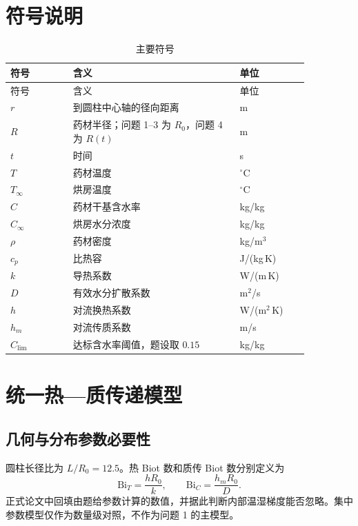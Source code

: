 \documentclass[UTF8,a4paper,11pt]{ctexart}
\begin{document}
\section{符号说明}

\begin{longtable}{p{0.18\linewidth}p{0.48\linewidth}p{0.20\linewidth}}
\caption{主要符号}\label{tab:symbols}\\
\toprule
符号 & 含义 & 单位\\
\midrule
\endfirsthead
\toprule
符号 & 含义 & 单位\\
\midrule
\endhead
$r$ & 到圆柱中心轴的径向距离 & m\\
$R$ & 药材半径；问题 1--3 为 $R_0$，问题 4 为 $R(t)$ & m\\
$t$ & 时间 & s\\
$T$ & 药材温度 & $^\circ$C\\
$T_\infty$ & 烘房温度 & $^\circ$C\\
$C$ & 药材干基含水率 & kg/kg\\
$C_\infty$ & 烘房水分浓度 & kg/kg\\
$\rho$ & 药材密度 & kg/m$^3$\\
$c_p$ & 比热容 & J/(kg\,K)\\
$k$ & 导热系数 & W/(m\,K)\\
$D$ & 有效水分扩散系数 & m$^2$/s\\
$h$ & 对流换热系数 & W/(m$^2$\,K)\\
$h_m$ & 对流传质系数 & m/s\\
$C_{\mathrm{lim}}$ & 达标含水率阈值，题设取 $0.15$ & kg/kg\\
\bottomrule
\end{longtable}

\section{统一热—质传递模型}

\subsection{几何与分布参数必要性}

圆柱长径比为 $L/R_0=12.5$。热 Biot 数和质传 Biot 数分别定义为
\begin{equation}
\mathrm{Bi}_T=\frac{hR_0}{k},\qquad \mathrm{Bi}_C=\frac{h_mR_0}{D}.
\end{equation}
正式论文中回填由题给参数计算的数值，并据此判断内部温湿梯度能否忽略。集中参数模型仅作为数量级对照，不作为问题 1 的主模型。
\end{document}
